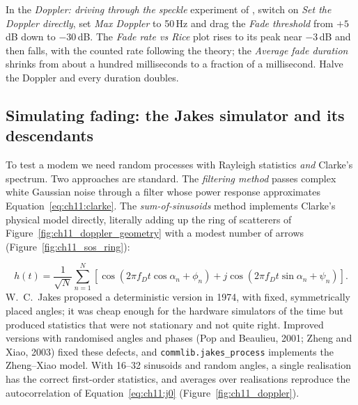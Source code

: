 \begin{tryit}
In the \emph{Doppler: driving through the speckle} experiment of , switch on
\emph{Set the Doppler directly}, set \emph{Max Doppler} to 50\,Hz and drag the \emph{Fade threshold}
from $+5$\,dB down to $-30$\,dB. The \emph{Fade rate vs Rice} plot rises to its peak near $-3$\,dB and
then falls, with the counted rate following the theory; the \emph{Average fade duration} shrinks from
about a hundred milliseconds to a fraction of a millisecond. Halve the Doppler and every duration doubles.
\end{tryit}

\subsection{Simulating fading: the Jakes simulator and its descendants}


To test a modem we need random processes with Rayleigh statistics \emph{and} Clarke's spectrum.
Two approaches are standard. The \emph{filtering method} passes complex white Gaussian noise
through a filter whose power response approximates Equation~\eqref{eq:ch11:clarke}. The
\emph{sum-of-sinusoids} method implements Clarke's physical model directly, literally adding up
the ring of scatterers of Figure~\ref{fig:ch11_doppler_geometry} with a modest number of arrows
(Figure~\ref{fig:ch11_sos_ring}):



\begin{equation}
h(t)=\frac{1}{\sqrt{N}}\sum_{n=1}^{N}\left[\cos(2\pi f_Dt\cos\alpha_n+\phi_n)+j\cos(2\pi f_Dt\sin\alpha_n+\psi_n)\right].
\end{equation}
W.~C.~Jakes proposed a deterministic version in 1974, with fixed, symmetrically placed angles; it was
cheap enough for the hardware simulators of the time but produced statistics that were not
stationary and not quite right. Improved versions with randomised angles and phases (Pop and
Beaulieu, 2001; Zheng and Xiao, 2003) fixed these defects, and \texttt{commlib.jakes\_process}
implements the Zheng--Xiao model. With 16--32 sinusoids and random angles, a single realisation
has the correct first-order statistics, and averages over realisations reproduce the
autocorrelation of Equation~\eqref{eq:ch11:j0} (Figure~\ref{fig:ch11_doppler}).


